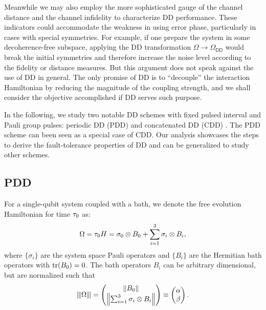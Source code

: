 \documentclass[aps,pra,reprint,superscriptaddress]{revtex4-2}
\newcommand{\Odd}{\Omega_{\mathsf{DD}}}
\begin{document}

Meanwhile we may also employ the more sophisticated gauge of the channel distance and the channel infidelity to characterize DD performance. These indicators could accommodate the weakness in using error phase, particularly in cases with special symmetries.
For example, if one prepare the system in some decoherence-free subspace, applying the DD transformation $\Omega \to \Odd$ would break the initial symmetries and therefore increase the noise level according to the fidelity or distance measures. But this argument does not speak against the use of DD in general. 
The only promise of DD is to ``decouple'' the interaction Hamiltonian by reducing the magnitude of the coupling strength, and we shall consider the objective accomplished if DD serves such purpose.


In the following, we study two notable  DD  schemes with fixed pulsed interval and Pauli group pulses: periodic DD (PDD) \cite{viola1999dynamical} and concatenated DD (CDD) \cite{khodjasteh2007performance}. The PDD scheme can been seen as a special case of CDD. Our analysis showcases the steps to derive the fault-tolerance properties of DD and can be generalized to study other schemes.



\subsection{PDD}
For a single-qubit system coupled with a bath, we denote the free evolution Hamiltonian for time $\tau_0$ as:
\begin{equation}\label{eq:omega-sq}
    \Omega = \tau_0 H = \sigma_0 \otimes B_0 + \sum_{i=1}^3 \sigma_i \otimes B_i,
\end{equation}
where 
$\{\sigma_i\}$ are the system space Pauli operators and
$\{B_i\}$ are the Hermitian bath operators with $\operatorname{tr}(B_0)=0$. The bath operators $B_i$ can be arbitrary dimensional, but are normalized such that  
\begin{equation}\label{eq:bathops-norm}
\opnorm{\Omega}
=
\begin{pmatrix}
\norm{B_0}\\
\norm[\Big]{\sum_{i=1}^3 \sigma_i \otimes B_i}
\end{pmatrix}\equiv\begin{pmatrix}
    \alpha\\
    \beta
    \end{pmatrix}.
\end{equation}
\end{document}
